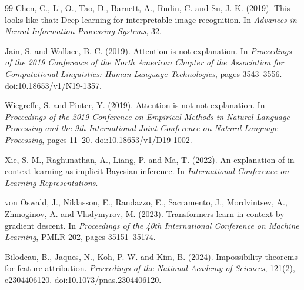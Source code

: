 \documentclass[11pt]{article}
\newcommand{\1}{\mathbf{1}}
\begin{document}
\begin{thebibliography}{99}
Chen, C., Li, O., Tao, D., Barnett, A., Rudin, C. and Su, J. K. (2019).
\newblock This looks like that: Deep learning for interpretable image recognition.
\newblock In \emph{Advances in Neural Information Processing Systems}, 32.

Jain, S. and Wallace, B. C. (2019).
\newblock Attention is not explanation.
\newblock In \emph{Proceedings of the 2019 Conference of the North American Chapter of the Association for Computational Linguistics: Human Language Technologies}, pages 3543--3556.
\newblock doi:10.18653/v1/N19-1357.

Wiegreffe, S. and Pinter, Y. (2019).
\newblock Attention is not not explanation.
\newblock In \emph{Proceedings of the 2019 Conference on Empirical Methods in Natural Language Processing and the 9th International Joint Conference on Natural Language Processing}, pages 11--20.
\newblock doi:10.18653/v1/D19-1002.


Xie, S. M., Raghunathan, A., Liang, P. and Ma, T. (2022).
\newblock An explanation of in-context learning as implicit Bayesian inference.
\newblock In \emph{International Conference on Learning Representations}.

von Oswald, J., Niklasson, E., Randazzo, E., Sacramento, J., Mordvintsev, A., Zhmoginov, A. and Vladymyrov, M. (2023).
\newblock Transformers learn in-context by gradient descent.
\newblock In \emph{Proceedings of the 40th International Conference on Machine Learning}, PMLR 202, pages 35151--35174.

Bilodeau, B., Jaques, N., Koh, P. W. and Kim, B. (2024).
\newblock Impossibility theorems for feature attribution.
\newblock \emph{Proceedings of the National Academy of Sciences}, 121(2), e2304406120.
\newblock doi:10.1073/pnas.2304406120.

\end{thebibliography}
\end{document}
